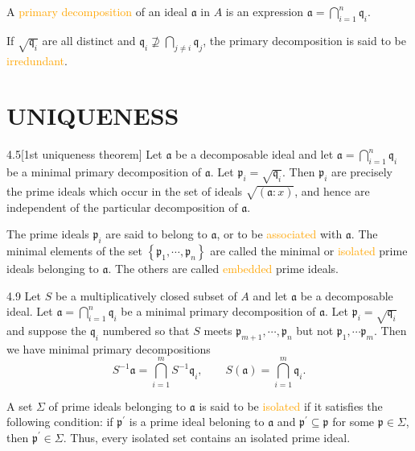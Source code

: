 \begin{definition}
	A \textcolor{orange}{primary decomposition} of an ideal $\mathfrak{a}$ in $A$ is an expression $\mathfrak{a}=\bigcap_{i=1}^n\mathfrak{q}_i$.
	
	If $\sqrt{\mathfrak{q}_i}$ are all distinct and $\mathfrak{q}_i\nsupseteq\bigcap_{j\neq i}\mathfrak{q}_j$, the primary decomposition is said to be \textcolor{orange}{irredundant}.
\end{definition}

\section*{UNIQUENESS}

\begin{proposition}{4.5}[1st uniqueness theorem]
	Let $\mathfrak{a}$ be a decomposable ideal and let $\mathfrak{a}=\bigcap_{i=1}^n\mathfrak{q}_i$ be a minimal primary decomposition of $\mathfrak{a}$. Let $\mathfrak{p}_i=\sqrt{\mathfrak{q}_i}$. Then $\mathfrak{p}_i$ are precisely the prime ideals which occur in the set of ideals $\sqrt{(\mathfrak{a}:x)}$, and hence are independent of the particular decomposition of $\mathfrak{a}$.
\end{proposition}

The prime ideals $\mathfrak{p}_i$ are said to belong to $\mathfrak{a}$, or to be \textcolor{orange}{associated} with $\mathfrak{a}$. The minimal elements of the set $\left\{\mathfrak{p}_1,\cdots,\mathfrak{p}_n\right\}$ are called the minimal or \textcolor{orange}{isolated} prime ideals belonging to $\mathfrak{a}$. The others are called \textcolor{orange}{embedded} prime ideals.

\begin{proposition}{4.9}
	Let $S$ be a multiplicatively closed subset of $A$ and let $\mathfrak{a}$ be a decomposable ideal. Let $\mathfrak{a}=\bigcap_{i=1}^n\mathfrak{q}_i$ be a minimal primary decomposition of $\mathfrak{a}$. Let $\mathfrak{p}_i=\sqrt{\mathfrak{q}_i}$ and suppose the $\mathfrak{q}_i$ numbered so that $S$ meets $\mathfrak{p}_{m+1},\cdots,\mathfrak{p}_n$ but not $\mathfrak{p}_1,\cdots\mathfrak{p}_m$. Then we have minimal primary decompositions
	\begin{equation*}
		S^{-1}\mathfrak{a}=\bigcap_{i=1}^mS^{-1}\mathfrak{q}_i,\qquad S(\mathfrak{a})=\bigcap_{i=1}^m\mathfrak{q}_i.
	\end{equation*}
\end{proposition}

A set $\Sigma$ of prime ideals belonging to $\mathfrak{a}$ is said to be \textcolor{orange}{isolated} if it satisfies the following condition: if $\mathfrak{p}^\prime$ is a prime ideal beloning to $\mathfrak{a}$ and $\mathfrak{p}^\prime\subseteq\mathfrak{p}$ for some $\mathfrak{p}\in\Sigma$, then $\mathfrak{p}^\prime\in\Sigma$. Thus, every isolated set contains an isolated prime ideal.

